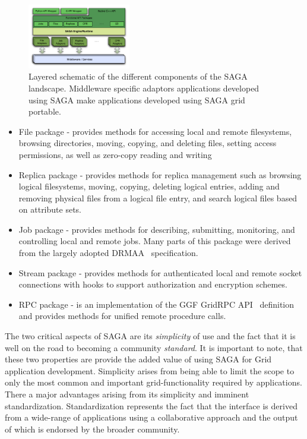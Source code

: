 \documentclass{sig-alternate}
\newcommand{\up}{\vspace*{-0.3em}}
\begin{document}
\begin{figure}[!ht]
  \begin{center}
      \includegraphics[width=0.40\textwidth]{stci_saga_figures-1.pdf}
  \end{center}
  \caption{\small Layered schematic of the different components
    of the SAGA landscape.  Middleware specific adaptors applications
    developed using SAGA make applications developed using SAGA grid
    portable.}\up\up\up\up\up
 \label{sagalayer}
\end{figure}

\begin{itemize}
\item File package - provides methods for accessing local and remote
  filesystems, browsing directories, moving, copying, and deleting
  files, setting access permissions, as well as zero-copy reading and
  writing
\item Replica package - provides methods for replica management such
  as browsing logical filesystems, moving, copying, deleting logical
  entries, adding and removing physical files from a logical file
  entry, and search logical files based on attribute sets.
\item Job package - provides methods for describing, submitting,
  monitoring, and controlling local and remote jobs. Many parts of
  this package were derived from the largely adopted
  DRMAA~\cite{drmaa_url} specification.
\item Stream package - provides methods for authenticated local and
  remote socket connections with hooks to support authorization and
  encryption schemes.
\item RPC package - is an implementation of the GGF GridRPC
  API~\cite{gridrpc_url} definition and provides methods for unified
  remote procedure calls.
\end{itemize}

The two critical aspects of SAGA are its {\it simplicity} of use and
the fact that it is well on the road to becoming a community {\it
  standard}.  It is important to note, that these two properties are
provide the added value of using SAGA for Grid application
development.  Simplicity arises from being able to limit the scope to
only the most common and important grid-functionality required by
applications.  There a major advantages arising from its simplicity
and imminent standardization.  Standardization represents the fact
that the interface is derived from a wide-range of applications using
a collaborative approach and the output of which is endorsed by the
broader community.
\end{document}
